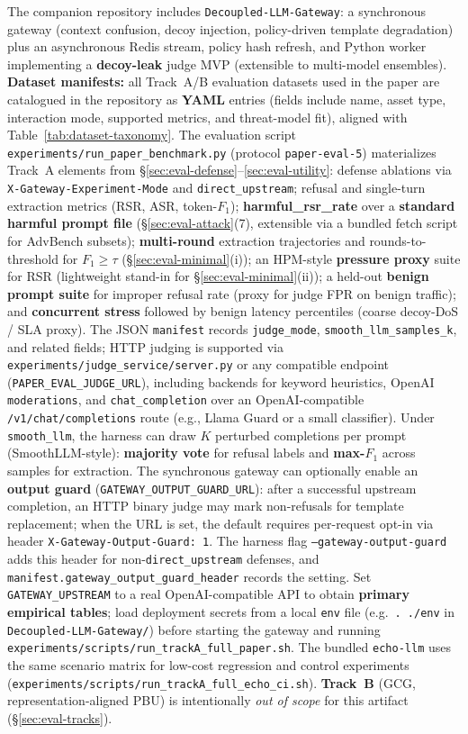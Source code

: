 \documentclass[letterpaper,twocolumn,10pt]{article}
\begin{document}
The companion repository includes \texttt{Decoupled-LLM-Gateway}: a synchronous gateway (context confusion, decoy injection, policy-driven template degradation) plus an asynchronous Redis stream, policy hash refresh, and Python worker implementing a \textbf{decoy-leak} judge MVP (extensible to multi-model ensembles). \textbf{Dataset manifests:} all Track~A/B evaluation datasets used in the paper are catalogued in the repository as \textbf{YAML} entries (fields include name, asset type, interaction mode, supported metrics, and threat-model fit), aligned with Table~\ref{tab:dataset-taxonomy}. The evaluation script \texttt{experiments/run\_paper\_benchmark.py} (protocol \texttt{paper-eval-5}) materializes Track~A elements from \S\ref{sec:eval-defense}--\ref{sec:eval-utility}: defense ablations via \texttt{X-Gateway-Experiment-Mode} and \texttt{direct\_upstream}; refusal and single-turn extraction metrics (RSR, ASR, token-$F_1$); \textbf{harmful\_rsr\_rate} over a \textbf{standard harmful prompt file} (\S\ref{sec:eval-attack}(7), extensible via a bundled fetch script for AdvBench subsets); \textbf{multi-round} extraction trajectories and rounds-to-threshold for $F_1\ge\tau$ (\S\ref{sec:eval-minimal}(i)); an HPM-style \textbf{pressure proxy} suite for RSR (lightweight stand-in for \S\ref{sec:eval-minimal}(ii)); a held-out \textbf{benign prompt suite} for improper refusal rate (proxy for judge FPR on benign traffic); and \textbf{concurrent stress} followed by benign latency percentiles (coarse decoy-DoS / SLA proxy). The JSON \texttt{manifest} records \texttt{judge\_mode}, \texttt{smooth\_llm\_samples\_k}, and related fields; HTTP judging is supported via \texttt{experiments/judge\_service/server.py} or any compatible endpoint (\texttt{PAPER\_EVAL\_JUDGE\_URL}), including backends for keyword heuristics, OpenAI \texttt{moderations}, and \texttt{chat\_completion} over an OpenAI-compatible \texttt{/v1/chat/completions} route (e.g., Llama Guard or a small classifier). Under \texttt{smooth\_llm}, the harness can draw $K$ perturbed completions per prompt (SmoothLLM-style): \textbf{majority vote} for refusal labels and \textbf{max-$F_1$} across samples for extraction. The synchronous gateway can optionally enable an \textbf{output guard} (\texttt{GATEWAY\_OUTPUT\_GUARD\_URL}): after a successful upstream completion, an HTTP binary judge may mark non-refusals for template replacement; when the URL is set, the default requires per-request opt-in via header \texttt{X-Gateway-Output-Guard: 1}. The harness flag \texttt{--gateway-output-guard} adds this header for non-\texttt{direct\_upstream} defenses, and \texttt{manifest.gateway\_output\_guard\_header} records the setting. Set \texttt{GATEWAY\_UPSTREAM} to a real OpenAI-compatible API to obtain \textbf{primary empirical tables}; load deployment secrets from a local \texttt{env} file (e.g.\ \texttt{. ./env} in \texttt{Decoupled-LLM-Gateway/}) before starting the gateway and running \texttt{experiments/scripts/run\_trackA\_full\_paper.sh}. The bundled \texttt{echo-llm} uses the same scenario matrix for low-cost regression and control experiments (\texttt{experiments/scripts/run\_trackA\_full\_echo\_ci.sh}). \textbf{Track~B} (GCG, representation-aligned PBU) is intentionally \emph{out of scope} for this artifact (\S\ref{sec:eval-tracks}). 
\end{document}
